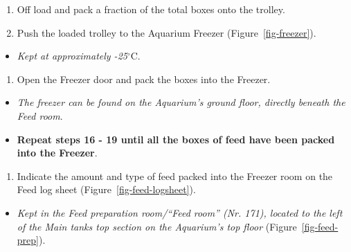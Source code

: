 \documentclass[
  letterpaper,
  DIV=11,
  numbers=noendperiod]{scrreprt}
\providecommand{\tightlist}{%
  \setlength{\itemsep}{0pt}\setlength{\parskip}{0pt}}\usepackage{longtable,booktabs,array}
\begin{document}
\begin{enumerate}
\def\labelenumi{\arabic{enumi}.}
\setcounter{enumi}{16}
\tightlist
\item
  Off load and pack a fraction of the total boxes onto the trolley.
\item
  Push the loaded trolley to the Aquarium Freezer
  (Figure~\ref{fig-freezer}).
\end{enumerate}

\begin{itemize}
\tightlist
\item
  \emph{Kept at approximately -25}\(^\circ\)C.
\end{itemize}

\begin{enumerate}
\def\labelenumi{\arabic{enumi}.}
\setcounter{enumi}{18}
\tightlist
\item
  Open the Freezer door and pack the boxes into the Freezer.
\end{enumerate}

\begin{itemize}
\item
  \emph{The freezer can be found on the Aquarium's ground floor,
  directly beneath the Feed room}.
\item
  \textbf{Repeat steps 16 - 19 until all the boxes of feed have been
  packed into the Freezer}.
\end{itemize}

\begin{enumerate}
\def\labelenumi{\arabic{enumi}.}
\setcounter{enumi}{19}
\tightlist
\item
  Indicate the amount and type of feed packed into the Freezer room on
  the Feed log sheet (Figure~\ref{fig-feed-logsheet}).
\end{enumerate}

\begin{itemize}
\tightlist
\item
  \emph{Kept in the Feed preparation room/``Feed room'' (Nr. 171),
  located to the left of the Main tanks top section on the Aquarium's
  top floor} (Figure~\ref{fig-feed-prep}).
\end{itemize}
\end{document}
